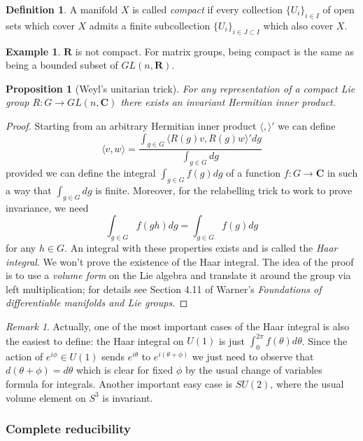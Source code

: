\documentclass[12pt]{article}
\newcommand{\CC}{\mathbf{C}}
\newcommand{\RR}{\mathbf{R}}
\newtheorem{prp}[thm]{Proposition}
\theoremstyle{definition}
\newtheorem{dfn}[thm]{Definition}
\newtheorem{exm}[thm]{Example}
\theoremstyle{check}
\theoremstyle{remark}
\newtheorem{rmk}[thm]{Remark}
\theoremstyle{TheoremNum}
\begin{document}
\begin{dfn}
A manifold $X$ is called {\em compact} if every collection $\{U_i\}_{i\in I}$ of open sets which cover $X$ admits a finite subcollection $\{U_i\}_{i\in J\subset I}$ which also cover $X$.
\end{dfn}
\begin{exm}
$\RR$ is not compact. For matrix groups, being compact is the same as being a bounded subset of $GL(n,\RR)$.
\end{exm}

\begin{prp}[Weyl's unitarian trick]\label{prp-weyl}
For any representation of a compact Lie group $R\colon G\to GL(n,\CC)$ there exists an invariant Hermitian inner product.
\end{prp}
\begin{proof}
Starting from an arbitrary Hermitian inner product $\langle,\rangle'$ we can define
\[\langle v,w\rangle=\frac{\int_{g\in G}\langle R(g)v,R(g)w\rangle'dg}{\int_{g\in G}dg}\]
provided we can define the integral $\int_{g\in G}f(g)dg$ of a function $f\colon G\to\CC$ in such a way that $\int_{g\in G}dg$ is finite. Moreover, for the relabelling trick to work to prove invariance, we need
\[\int_{g\in G}f(gh)dg=\int_{g\in G}f(g)dg\]
for any $h\in G$. An integral with these properties exists and is called the {\em Haar integral}. We won't prove the existence of the Haar integral. The idea of the proof is to use a {\em volume form} on the Lie algebra and translate it around the group via left multiplication; for details see Section 4.11 of Warner's {\em Foundations of differentiable manifolds and Lie groups}.
\end{proof}
\begin{rmk}
Actually, one of the most important cases of the Haar integral is also the easiest to define: the Haar integral on $U(1)$ is just $\int_0^{2\pi}f(\theta)d\theta$. Since the action of $e^{i\phi}\in U(1)$ sends $e^{i\theta}$ to $e^{i(\theta+\phi)}$ we just need to observe that $d(\theta+\phi)=d\theta$ which is clear for fixed $\phi$ by the usual change of variables formula for integrals. Another important easy case is $SU(2)$, where the usual volume element on $S^3$ is invariant.
\end{rmk}

\subsubsection{Complete reducibility}
\end{document}
